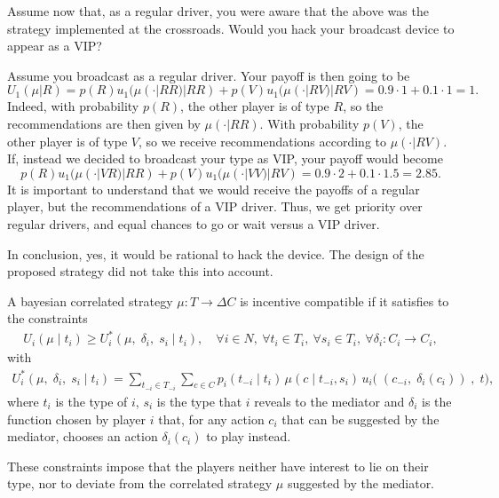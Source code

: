 \begin{example}
Assume now that, as a regular driver, you were aware that the above was the strategy implemented at the crossroads. Would you hack your broadcast device to appear as a VIP?

Assume you broadcast as a regular driver. Your payoff is then going to be 
$$ U_1(\mu | R) =  p(R) u_1(\mu(\cdot | RR) | RR) + p(V)  u_1(\mu(\cdot | RV) | RV) = 0.9 \cdot 1 + 0.1 \cdot 1 = 1. $$
Indeed, with probability $p(R)$, the other player is of type $R$, so the recommendations are then given by $\mu(\cdot | RR)$. With probability $p(V)$, the other player is of type $V$, so we receive recommendations according to $\mu(\cdot | RV)$.
If, instead we decided to broadcast your type as VIP, your payoff would become
$$ p(R) u_1(\mu(\cdot | VR) | RR) + p(V)  u_1(\mu(\cdot | VV) | RV) = 0.9 \cdot 2 + 0.1 \cdot 1.5 = 2.85. $$
It is important to understand that we would receive the payoffs of a regular player, but the recommendations of a VIP driver. Thus, we get priority over regular drivers, and equal chances to go or wait versus a VIP driver.


In conclusion, yes, it would be rational to hack the device. The design of the proposed strategy did not take this into account.
\end{example}


\begin{definition}
A bayesian correlated strategy $\mu : T \rightarrow \Delta C$ is incentive compatible if it satisfies to the constraints
\begin{align*}
	U_i(\mu \; | \; t_i) \geq U_i^*(\mu, \; \delta_i, \; s_i \; | \; t_i), \quad \forall i \in N, \ \forall t_i \in T_i, \ \forall s_i \in T_i, \ \forall \delta_i : C_i \rightarrow C_i,
\end{align*}
with 
\begin{align*}
	U_i^*(\mu, \; \delta_i, \; s_i \; | \; t_i) = \sum_{t_{-i} \in T_{-i}} \sum_{c \in C} p_i(t_{-i} \; | \; t_i) \, \mu(c \; | \; t_{-i}, s_i) \, u_i\big( \; (c_{-i}, \; \delta_i(c_i)) \;, \; t \big),
\end{align*}
where $t_i$ is the type of $i$, $s_i$ is the type that $i$ reveals to the mediator and $\delta_i$ is the function chosen by player $i$ that, for any action $c_i$ that can be suggested by the mediator, chooses an action $\delta_i(c_i)$ to play instead. 
\end{definition}

These constraints impose that the players neither have interest to lie on their type, nor to deviate from the correlated strategy $\mu$ suggested by the mediator. 


